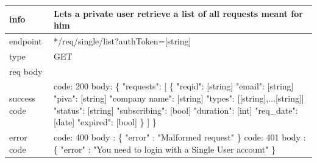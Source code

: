 \documentclass[titlepage]{article}
\begin{document}
	\vspace{\baselineskip}
	
	\begin{tabularx}{\textwidth}{lX} \hline
		info & Lets a private user retrieve a list of all requests meant for him \\ \hline
		endpoint & */req/single/list?authToken=[string] \\ \hline
		type & GET \\ \hline
		req body & \\ \hline
		success code & code: 200
		body: \{ \newline
		"requests": [ \newline
		\{ \newline
		"reqid": [string] \newline
		"email": [string] \newline
		"piva": [string] \newline
		"company name": [string] \newline
		"types": [[string],...[string]] \newline
		"status": [string] \newline
		"subscribing": [bool] \newline
		"duration": [int] \newline
		"req\_date": [date] \newline
		"expired": [bool] \newline
		\} \newline
		] \newline
		\} \\ \hline
		error code &
		code: 400 \newline
		body : \{ "error" : "Malformed request" \} \newline \newline
		code: 401 \newline
		body : \{ "error" : "You need to login with a Single User account" \} \\ \hline
	\end{tabularx}
	
	\vspace{\baselineskip}
	
\end{document}
